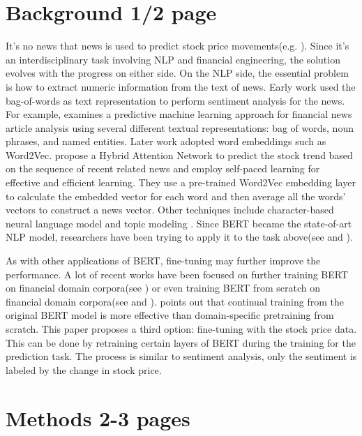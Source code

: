 \documentclass[11pt]{article}
\begin{document}
\section{Background 1/2 page}

It's no news that news is used to predict stock price movements(e.g. \citealp{Tetlock:2007}). Since it's an interdisciplinary task involving NLP and financial engineering, the solution evolves with the progress on either side. On the NLP side, the essential problem is how to extract numeric information from the text of news. Early work used the bag-of-words as text representation to perform sentiment analysis for the news. For example, \citet{Schumaker:2009} examines a predictive machine learning approach for financial news article analysis using several different textual representations: bag of words, noun phrases, and named entities. Later work adopted word embeddings such as Word2Vec.\citet{Hu:2018} propose a Hybrid Attention Network to predict the stock trend based on the sequence of recent related news and employ self-paced learning for effective and efficient learning. They use a pre-trained Word2Vec embedding layer to calculate the embedded vector for each word and then average all the words' vectors to construct a news vector. Other techniques include character-based neural language model \citep{dos-santos-pinheiro-dras-2017-stock} and topic modeling \citep{nguyen-shirai-2015-topic}. Since BERT became the state-of-art NLP model, researchers have been trying to apply it to the task above(see \citet{sawhney-etal-2021-quantitative} and \citet{tsutsumi-utsuro-2022-detecting}). 

As with other applications of BERT, fine-tuning may further improve the performance. A lot of recent works have been focused on further training BERT on financial domain corpora(see \citet{araci2019finbert}) or even training BERT from scratch on financial domain corpora(see \citet{yang2020finbert} and \citet{ijcai2020p622}). \citet{peng-etal-2021-domain} points out that continual training from the original BERT model is more effective than domain-specific pretraining from scratch. This paper proposes a third option: fine-tuning with the stock price data. This can be done by retraining certain layers of BERT during the training for the prediction task. The process is similar to sentiment analysis, only the sentiment is labeled by the change in stock price.


\section{Methods 2-3 pages}
\end{document}
